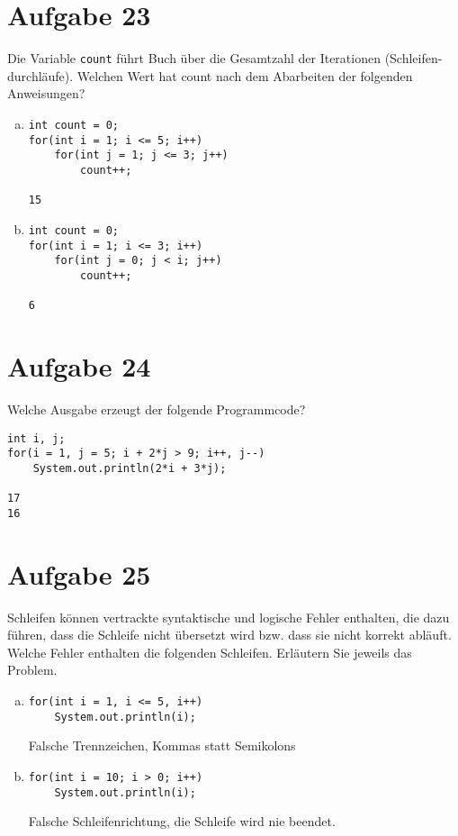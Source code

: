 \documentclass[10pt, oneside]{article}
\begin{document}
\section{Aufgabe 23}

Die Variable \verb|count| führt Buch über die Gesamtzahl der Iterationen (Schleifen-
durchläufe). Welchen Wert hat count nach dem Abarbeiten der folgenden
Anweisungen?

\begin{enumerate}[(a)]
\item
\begin{verbatim}
int count = 0;
for(int i = 1; i <= 5; i++)
    for(int j = 1; j <= 3; j++)
        count++;

15
\end{verbatim}

\item
\begin{verbatim}
int count = 0;
for(int i = 1; i <= 3; i++)
    for(int j = 0; j < i; j++)
        count++;

6
\end{verbatim}
\end{enumerate}

\section{Aufgabe 24}

Welche Ausgabe erzeugt der folgende Programmcode?

\begin{verbatim}
int i, j;
for(i = 1, j = 5; i + 2*j > 9; i++, j--)
    System.out.println(2*i + 3*j);

17
16
\end{verbatim}

\section{Aufgabe 25}

Schleifen können vertrackte syntaktische und logische Fehler enthalten, die dazu
führen, dass die Schleife nicht übersetzt wird bzw. dass sie nicht korrekt abläuft.
Welche Fehler enthalten die folgenden Schleifen. Erläutern Sie jeweils das Problem.

\begin{enumerate}[(a)]
\item
\begin{verbatim}
for(int i = 1, i <= 5, i++)
    System.out.println(i);
\end{verbatim}
Falsche Trennzeichen, Kommas statt Semikolons

\item
\begin{verbatim}
for(int i = 10; i > 0; i++)
    System.out.println(i);
\end{verbatim}
Falsche Schleifenrichtung, die Schleife wird nie beendet.

\end{enumerate}
\end{document}
